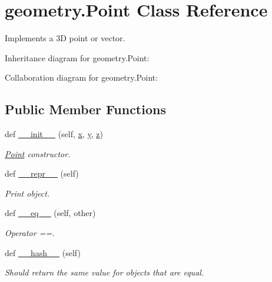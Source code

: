 \hypertarget{classgeometry_1_1Point}{}\section{geometry.\+Point Class Reference}
\label{classgeometry_1_1Point}


Implements a 3D point or vector.  




Inheritance diagram for geometry.\+Point\+:


Collaboration diagram for geometry.\+Point\+:
\subsection*{Public Member Functions}
\begin{DoxyCompactItemize}
\item 
def \hyperlink{classgeometry_1_1Point_abb1bdc9d9ad1a67d3d13800037006ccb}{\+\_\+\+\_\+init\+\_\+\+\_\+} (self, \hyperlink{classgeometry_1_1Point_a98f21eef44d1c182f04f1262c90815fc}{x}, \hyperlink{classgeometry_1_1Point_a4ef9a436e11219296ba5e3fff9e87711}{y}, \hyperlink{classgeometry_1_1Point_afd1ce6427fa3e28c9c42934bb5d76165}{z})
\begin{DoxyCompactList}\small\item\em \hyperlink{classgeometry_1_1Point}{Point} constructor. \end{DoxyCompactList}\item 
def \hyperlink{classgeometry_1_1Point_aebe045ef26f241b525459dfa1ee3b85f}{\+\_\+\+\_\+repr\+\_\+\+\_\+} (self)
\begin{DoxyCompactList}\small\item\em Print object. \end{DoxyCompactList}\item 
def \hyperlink{classgeometry_1_1Point_a9cbf68fff40fffb87e6acff640c95294}{\+\_\+\+\_\+eq\+\_\+\+\_\+} (self, other)
\begin{DoxyCompactList}\small\item\em Operator ==. \end{DoxyCompactList}\item 
def \hyperlink{classgeometry_1_1Point_ae9e26dfa297c49feb6e0c2808c74bba8}{\+\_\+\+\_\+hash\+\_\+\+\_\+} (self)
\begin{DoxyCompactList}\small\item\em Should return the same value for objects that are equal. \end{DoxyCompactList}\item 

\end{DoxyCompactItemize}
